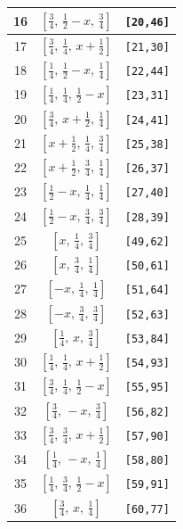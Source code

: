 \documentclass[fleqn,8pt]{jsarticle}
\begin{document}
\begin{longtable}{ccc}
16 & $\left[ \frac{3}{4},\, \frac{1}{2} - x,\, \frac{3}{4} \right]$ & {\tt [20,46]} \\ \hline
17 & $\left[ \frac{3}{4},\, \frac{1}{4},\, x + \frac{1}{2} \right]$ & {\tt [21,30]} \\ \hline
18 & $\left[ \frac{1}{4},\, \frac{1}{2} - x,\, \frac{1}{4} \right]$ & {\tt [22,44]} \\ \hline
19 & $\left[ \frac{1}{4},\, \frac{1}{4},\, \frac{1}{2} - x \right]$ & {\tt [23,31]} \\ \hline
20 & $\left[ \frac{3}{4},\, x + \frac{1}{2},\, \frac{1}{4} \right]$ & {\tt [24,41]} \\ \hline
21 & $\left[ x + \frac{1}{2},\, \frac{1}{4},\, \frac{3}{4} \right]$ & {\tt [25,38]} \\ \hline
22 & $\left[ x + \frac{1}{2},\, \frac{3}{4},\, \frac{1}{4} \right]$ & {\tt [26,37]} \\ \hline
23 & $\left[ \frac{1}{2} - x,\, \frac{1}{4},\, \frac{1}{4} \right]$ & {\tt [27,40]} \\ \hline
24 & $\left[ \frac{1}{2} - x,\, \frac{3}{4},\, \frac{3}{4} \right]$ & {\tt [28,39]} \\ \hline
25 & $\left[ x,\, \frac{1}{4},\, \frac{3}{4} \right]$ & {\tt [49,62]} \\ \hline
26 & $\left[ x,\, \frac{3}{4},\, \frac{1}{4} \right]$ & {\tt [50,61]} \\ \hline
27 & $\left[ - x,\, \frac{1}{4},\, \frac{1}{4} \right]$ & {\tt [51,64]} \\ \hline
28 & $\left[ - x,\, \frac{3}{4},\, \frac{3}{4} \right]$ & {\tt [52,63]} \\ \hline
29 & $\left[ \frac{1}{4},\, x,\, \frac{3}{4} \right]$ & {\tt [53,84]} \\ \hline
30 & $\left[ \frac{1}{4},\, \frac{1}{4},\, x + \frac{1}{2} \right]$ & {\tt [54,93]} \\ \hline
31 & $\left[ \frac{3}{4},\, \frac{1}{4},\, \frac{1}{2} - x \right]$ & {\tt [55,95]} \\ \hline
32 & $\left[ \frac{3}{4},\, - x,\, \frac{3}{4} \right]$ & {\tt [56,82]} \\ \hline
33 & $\left[ \frac{3}{4},\, \frac{3}{4},\, x + \frac{1}{2} \right]$ & {\tt [57,90]} \\ \hline
34 & $\left[ \frac{1}{4},\, - x,\, \frac{1}{4} \right]$ & {\tt [58,80]} \\ \hline
35 & $\left[ \frac{1}{4},\, \frac{3}{4},\, \frac{1}{2} - x \right]$ & {\tt [59,91]} \\ \hline
36 & $\left[ \frac{3}{4},\, x,\, \frac{1}{4} \right]$ & {\tt [60,77]} \\ \hline

\end{longtable}
\end{document}
